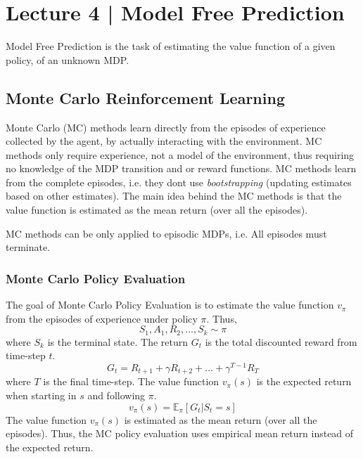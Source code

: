\section{Lecture 4 | Model Free Prediction}
Model Free Prediction is the task of estimating the value function of a given policy, 
of an unknown MDP. 

\subsection{Monte Carlo Reinforcement Learning}
Monte Carlo (MC) methods learn directly from the episodes of experience collected by
the agent, by actually interacting with the environment. MC methods only require
experience, not a model of the environment, thus requiring no knowledge of the MDP transition 
and or reward functions. MC methods learn from the complete episodes,
i.e. they dont use \emph{bootstrapping} (updating estimates based 
on other estimates). The main idea behind the MC methods is that the value
function is estimated as the mean return (over all the episodes).

\begin{note}
    MC methods can be only applied to episodic MDPs, i.e. 
    All episodes must terminate.
\end{note}

\subsubsection*{Monte Carlo Policy Evaluation}
The goal of Monte Carlo Policy Evaluation is to estimate the value function
\(v_{\pi}\) from the episodes of experience under policy \(\pi\).
Thus,
\[
    S_1, A_1, R_2, \dots, S_k  \sim \pi
\]
where \(S_k\) is the terminal state. The return \(G_t\) is the total discounted
reward from time-step \(t\).
\[
    G_t = R_{t+1} + \gamma R_{t+2} + \dots + \gamma^{T-1}R_T
\]
where \(T\) is the final time-step. The value function \(v_{\pi}(s)\) is the
expected return when starting in \(s\) and following \(\pi\).
\[
    v_{\pi}(s) = \mathbb{E}_{\pi}[G_t | S_t = s]
\]
The value function \(v_{\pi}(s)\) is estimated as the mean return (over all the
episodes). Thus, the MC policy evaluation uses empirical mean return instead of the
expected return.

